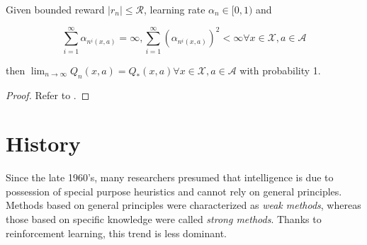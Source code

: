 \begin{theorem}
\label{thm:reinforcement-learning-q-learning-convergence}
	Given bounded reward $|r_{n}|\leq \mathcal{R}$, learning rate $\alpha_{n}\in[0,1)$ and 
	
	$$
	\sum_{i=1}^{\infty} \alpha_{n^{i}(x,a)}=\infty,\sum_{i=1}^{\infty}(\alpha_{n^{i}(x,a)})^{2} < \infty \forall x\in\mathcal{X},a\in\mathcal{A}
	$$
	
	then $\lim_{n\rightarrow\infty} Q_{n}(x,a)=Q_{*}(x,a)\forall x\in\mathcal{X},a\in\mathcal{A}$ with probability 1.
	
	\begin{proof}
		Refer to \cite{watkins1992q}.
	\end{proof}

\end{theorem}






\section{History}
\label{sec:reinforcement-learning-history}
Since the late 1960's, many researchers presumed that intelligence is due to possession of special purpose heuristics and cannot rely on general principles. Methods based on general principles were characterized as \textit{weak methods}, whereas those based on specific knowledge were called \textit{strong methods}. Thanks to reinforcement learning, this trend is less dominant.

